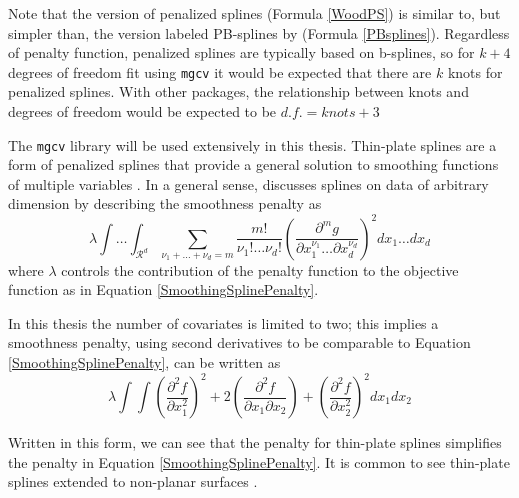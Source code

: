 \documentclass[phdcss]{SDSUThesis}
\begin{document}
Note that the \cite{wood-2017} version of penalized splines (Formula \ref{WoodPS}) is similar to, but simpler than, the version labeled PB-splines by \cite{eilers-1996} (Formula \ref{PBsplines}). Regardless of penalty function, penalized splines are typically based on b-splines, so for $k+4$ degrees of freedom fit using \texttt{mgcv} it would be expected that there are $k$ knots for penalized splines. With other packages, the relationship between knots and degrees of freedom would be expected to be $d.f. = knots+3$

The \texttt{mgcv} library will be used extensively in this thesis. Thin-plate splines \cite{wood-2003} are a form of penalized splines that provide a general solution to smoothing functions of multiple variables \cite{wood-2017}. In a general sense, \cite{wood-2003} discusses splines on data of arbitrary dimension by describing the smoothness penalty as
\begin{equation}
   \lambda \int \dots \int_{\mathcal{R}^d}
   \sum_{\nu_1 + \dots + \nu_d = m} 
   \frac{m!}{\nu_1 ! \dots \nu_d !}
   \left( \frac{\partial ^m g}{\partial x_1^{\nu_1} \dots \partial x_d^{\nu_d}}\right)^2
   dx_1 \dots d x_d
\end{equation}
where $\lambda$ controls the contribution of the penalty function to the objective function as in Equation \ref{SmoothingSplinePenalty}.

In this thesis the number of covariates is limited to two; this implies a smoothness penalty, using second derivatives to be comparable to Equation \ref{SmoothingSplinePenalty}, can be written \cite{wood-2017} as
\begin{equation}\label{Thinplate2}
   \lambda \int \int \left( \frac{\partial^2 f}{\partial x_1^2}\right)^2  +
              2 \left( \frac{\partial^2 f}{\partial x_1 \partial x_2} \right) +
              \left( \frac{\partial^2 f}{\partial x_2^2}\right)^2 d x_1 d x_2
\end{equation}

Written in this form, we can see that the penalty for thin-plate splines simplifies the penalty in Equation \ref{SmoothingSplinePenalty}. It is common to see thin-plate splines extended to non-planar surfaces \cite{bookstein-06-1989, keller-02-2019}. 
\end{document}
